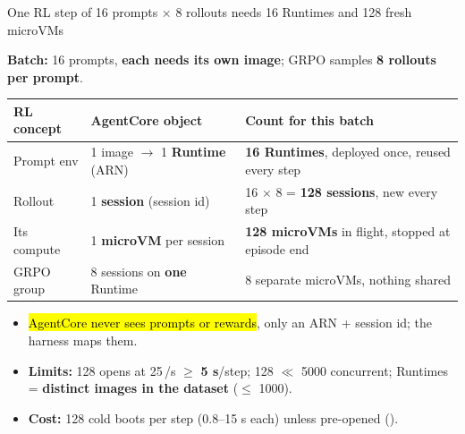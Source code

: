 \begin{frame}{One RL step of 16 prompts $\times$ 8 rollouts needs 16 Runtimes and 128 fresh microVMs}
{\footnotesize\textbf{Batch:} 16 prompts, \textbf{each needs its own image}; GRPO samples \textbf{8 rollouts per prompt}.\par}
\vspace{1.5mm}
\scriptsize
\begin{tabularx}{\textwidth}{@{}l l Y@{}}
\toprule
\textbf{RL concept} & \textbf{AgentCore object} & \textbf{Count for this batch}\\
\midrule
Prompt env & 1 image $\rightarrow$ 1 \textbf{Runtime} (ARN) & \textbf{16 Runtimes}, deployed once, reused every step\\
Rollout & 1 \textbf{session} (session id) & 16 $\times$ 8 = \textbf{128 sessions}, new every step\\
Its compute & 1 \textbf{microVM} per session & \textbf{128 microVMs} in flight, stopped at episode end\\
GRPO group & 8 sessions on \textbf{one} Runtime & 8 separate microVMs, nothing shared\\
\bottomrule
\end{tabularx}
\par\vspace{2mm}
\begin{itemize}\footnotesize\setlength{\itemsep}{0.8mm}
\item \hl{AgentCore never sees prompts or rewards}, only an ARN + session id; the harness maps them.
\item \textbf{Limits:} 128 opens at 25\,/s $\ge$ \textbf{5 s}/step; 128 $\ll$ 5000 concurrent; Runtimes = \textbf{distinct images in the dataset} ($\le$ 1000).
\item \textbf{Cost:} 128 cold boots per step (0.8--15 s each) unless pre-opened ().
\end{itemize}
\end{frame}

